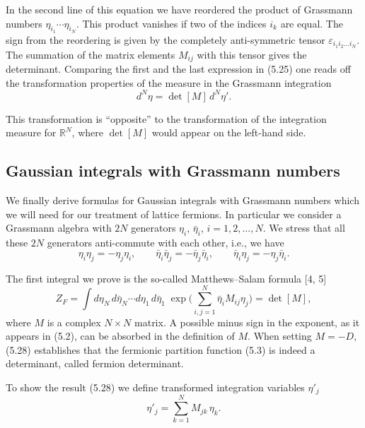 In the second line of this equation we have reordered the product of Grassmann
numbers $\eta_{i_1}\cdots\eta_{i_N}$. This product vanishes if two of the indices $i_k$ are equal.
The sign from the reordering is given by the completely anti-symmetric tensor
$\varepsilon_{i_1i_2\ldots i_N}$. The summation of the matrix elements $M_{ij}$ with this tensor gives the
determinant. Comparing the first and the last expression in (5.25) one reads
off the transformation properties of the measure in the Grassmann integration
\begin{equation}
  d^N\eta = \det[M]\,d^N\eta' .
\end{equation}

This transformation is ``opposite'' to the transformation of the integration
measure for $\mathbb{R}^N$, where $\det[M]$ would appear on the left-hand side.

\subsection{Gaussian integrals with Grassmann numbers}

We finally derive formulas for Gaussian integrals with Grassmann numbers
which we will need for our treatment of lattice fermions. In particular we
consider a Grassmann algebra with $2N$ generators $\eta_i$, $\bar{\eta}_i$, $i = 1, 2, \ldots, N$. We
stress that all these $2N$ generators anti-commute with each other, i.e., we have
\begin{equation}
  \eta_i\eta_j = -\eta_j\eta_i, \qquad
  \bar{\eta}_i\bar{\eta}_j = -\bar{\eta}_j\bar{\eta}_i, \qquad
  \bar{\eta}_i\eta_j = -\eta_j\bar{\eta}_i .
\end{equation}

The first integral we prove is the so-called Matthews--Salam formula [4, 5]
\begin{equation}
  Z_F = \int d\eta_N\,d\bar{\eta}_N\cdots d\eta_1\,d\bar{\eta}_1\;
    \exp\Big(\sum_{i,j=1}^{N}\bar{\eta}_i M_{ij}\eta_j\Big) = \det[M] ,
\end{equation}
where $M$ is a complex $N \times N$ matrix. A possible minus sign in the exponent,
as it appears in (5.2), can be absorbed in the definition of $M$. When setting
$M = -D$, (5.28) establishes that the fermionic partition function (5.3) is
indeed a determinant, called fermion determinant.

To show the result (5.28) we define transformed integration variables $\eta'_j$
\begin{equation}
  \eta'_j = \sum_{k=1}^{N}M_{jk}\,\eta_k .
\end{equation}


